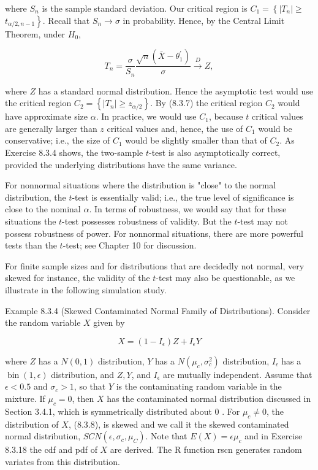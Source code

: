 where $S_{n}$ is the sample standard deviation. Our critical region is $C_{1}=\left\{\left|T_{n}\right| \geq\right.$ $\left.t_{\alpha / 2, n-1}\right\}$. Recall that $S_{n} \rightarrow \sigma$ in probability. Hence, by the Central Limit Theorem, under $H_{0}$,


\begin{equation*}
T_{n}=\frac{\sigma}{S_{n}} \frac{\sqrt{n}\left(\bar{X}-\theta_{1}^{\prime}\right)}{\sigma} \xrightarrow{D} Z, \tag{8.3.7}
\end{equation*}


where $Z$ has a standard normal distribution. Hence the asymptotic test would use the critical region $C_{2}=\left\{\left|T_{n}\right| \geq z_{\alpha / 2}\right\}$. By (8.3.7) the critical region $C_{2}$ would have approximate size $\alpha$. In practice, we would use $C_{1}$, because $t$ critical values are generally larger than $z$ critical values and, hence, the use of $C_{1}$ would be conservative; i.e., the size of $C_{1}$ would be slightly smaller than that of $C_{2}$. As Exercise 8.3.4 shows, the two-sample $t$-test is also asymptotically correct, provided the underlying distributions have the same variance.

For nonnormal situations where the distribution is "close" to the normal distribution, the $t$-test is essentially valid; i.e., the true level of significance is close to the nominal $\alpha$. In terms of robustness, we would say that for these situations the $t$-test possesses robustness of validity. But the $t$-test may not possess robustness of power. For nonnormal situations, there are more powerful tests than the $t$-test; see Chapter 10 for discussion.

For finite sample sizes and for distributions that are decidedly not normal, very skewed for instance, the validity of the $t$-test may also be questionable, as we illustrate in the following simulation study.

Example 8.3.4 (Skewed Contaminated Normal Family of Distributions). Consider the random variable $X$ given by


\begin{equation*}
X=\left(1-I_{\epsilon}\right) Z+I_{\epsilon} Y \tag{8.3.8}
\end{equation*}


where $Z$ has a $N(0,1)$ distribution, $Y$ has a $N\left(\mu_{c}, \sigma_{c}^{2}\right)$ distribution, $I_{\epsilon}$ has a $\operatorname{bin}(1, \epsilon)$ distribution, and $Z, Y$, and $I_{\epsilon}$ are mutually independent. Assume that $\epsilon<0.5$ and $\sigma_{c}>1$, so that $Y$ is the contaminating random variable in the mixture. If $\mu_{c}=0$, then $X$ has the contaminated normal distribution discussed in Section 3.4.1, which is symmetrically distributed about 0 . For $\mu_{c} \neq 0$, the distribution of $X$, (8.3.8), is skewed and we call it the skewed contaminated normal distribution, $S C N\left(\epsilon, \sigma_{c}, \mu_{C}\right)$. Note that $E(X)=\epsilon \mu_{c}$ and in Exercise 8.3.18 the cdf and pdf of $X$ are derived. The R function rscn generates random variates from this distribution.

